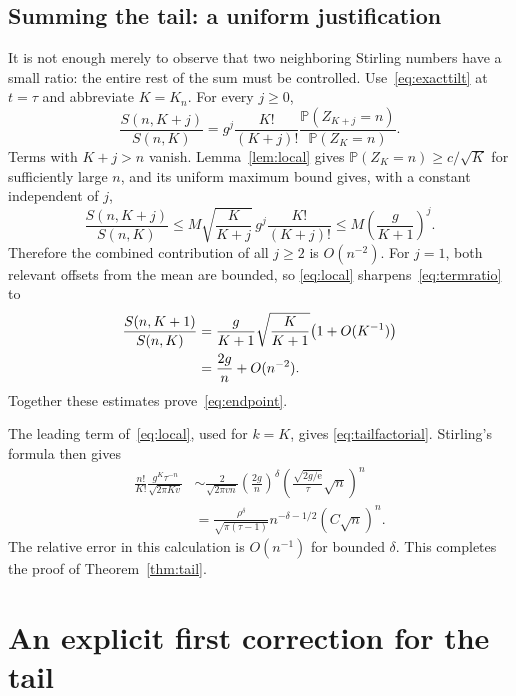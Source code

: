 \documentclass[11pt,a4paper]{article}
\numberwithin{equation}{section}
\theoremstyle{remark}
\newcommand{\e}{\mathrm e}
\newcommand{\Prob}{\mathbb P}
\begin{document}
\subsection{Summing the tail: a uniform justification}
It is not enough merely to observe that two neighboring Stirling numbers
have a small ratio: the entire rest of the sum must be controlled.
Use~\eqref{eq:exacttilt} at $t=\tau$ and abbreviate $K=K_n$.
For every $j\ge0$,
\begin{equation}\label{eq:termratio}
 \frac{S(n,K+j)}{S(n,K)}
 =g^j\frac{K!}{(K+j)!}
       \frac{\Prob(Z_{K+j}=n)}{\Prob(Z_K=n)}.
\end{equation}
Terms with $K+j>n$ vanish. Lemma~\ref{lem:local} gives
$\Prob(Z_K=n)\ge c/\sqrt K$ for sufficiently large $n$, and its uniform
maximum bound gives, with a constant independent of $j$,
\begin{equation}\label{eq:uniformratio}
 \frac{S(n,K+j)}{S(n,K)}
 \le M\sqrt{\frac K{K+j}}\,g^j\frac{K!}{(K+j)!}
 \le M\left(\frac g{K+1}\right)^j.
\end{equation}
Therefore the combined contribution of all $j\ge2$ is $O(n^{-2})$.
For $j=1$, both relevant offsets from the mean are bounded, so
\eqref{eq:local} sharpens~\eqref{eq:termratio} to
\begin{align}
 \frac{S(n,K+1)}{S(n,K)}
 &=\frac g{K+1}\sqrt{\frac K{K+1}}\bigl(1+O(K^{-1})\bigr)\notag\\
 &=\frac{2g}{n}+O(n^{-2}).\label{eq:neighbor}
\end{align}
Together these estimates prove~\eqref{eq:endpoint}.

The leading term of~\eqref{eq:local}, used for $k=K$, gives
\eqref{eq:tailfactorial}. Stirling's formula then gives
\begin{align*}
 \frac{n!}{K!}\frac{g^K\tau^{-n}}{\sqrt{2\pi Kv}}
 &\sim \frac{2}{\sqrt{2\pi v n}}
       \left(\frac{2g}{n}\right)^\delta
       \left(\frac{\sqrt{2g/\e}}{\tau}\sqrt n\right)^n\\
 &=\frac{\rho^\delta}{\sqrt{\pi(\tau-1)}}
          n^{-\delta-1/2}(C\sqrt n)^n.
\end{align*}
The relative error in this calculation is $O(n^{-1})$ for bounded
$\delta$. This completes the proof of Theorem~\ref{thm:tail}.

\section{An explicit first correction for the tail}\label{sec:tailcorrection}
\end{document}
